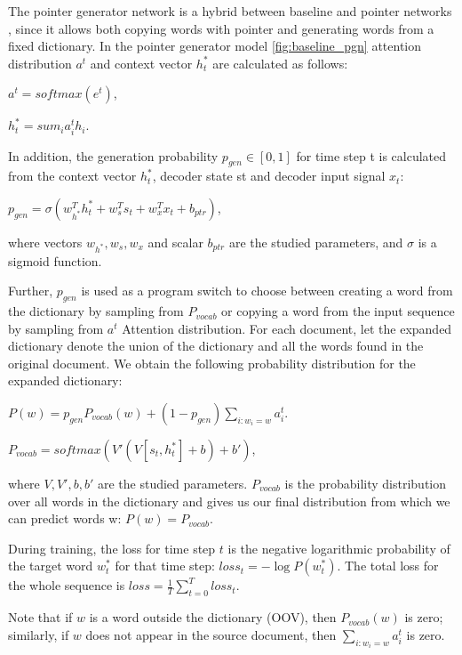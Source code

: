 \documentclass{article}
\begin{document}
The pointer generator network is a hybrid between baseline and pointer networks \cite{article_5}, since it allows both copying words with pointer and generating words from a fixed dictionary. In the pointer generator model \ref{fig:baseline_pgn} attention distribution $a^t$ and context vector $h^{*}_{t}$ are calculated as follows:
\begin{center}
    $a^t = softmax(e^t)$,
\end{center}
\begin{center}
    $h^{*}_{t} = sum_{i}a^{t}_{i}h_i$.
\end{center}

In addition, the generation probability $p_{gen}\in[0,1]$ for time step t is calculated from the context vector $h^{*}_{t}$, decoder state st and decoder input signal $x_t$:

\begin{center}
    $p_{gen} = \sigma(w^{T}_{h^{*}}h^{*}_{t} + w^{T}_{s}s_{t} + w^{T}_{x}x_{t} + b_{ptr})$,
\end{center}
where vectors $w_{h^{*}}, w_s, w_x$ and scalar $b_{ptr}$ are the studied parameters, and $\sigma$ is a sigmoid function.

Further, $p_{gen}$ is used as a program switch to choose between creating a word from the dictionary by sampling from $P_{vocab}$ or copying a word from the input sequence by sampling from $a^t$ Attention distribution. For each document, let the expanded dictionary denote the union of the dictionary and all the words found in the original document. We obtain the following probability distribution for the expanded dictionary:
\begin{center}
    $P(w) = p_{gen}P_{vocab}(w) + (1-p_{gen})\sum_{i: w_i = w}a^{t}_{i}$.
\end{center}
\begin{center}
    $P_{vocab} = softmax(V'(V[s_t,h^{*}_{t}]+b)+b')$,
\end{center}
where $V, V', b, b'$ are the studied parameters. $P_{vocab}$ is the probability distribution over all words in the dictionary and gives us our final distribution from which we can predict words w: $P(w) = P_{vocab}$.

During training, the loss for time step $t$ is the negative logarithmic probability of the target word $w^{*}_{t}$ for that time step: ${loss}_t = -\log{P(w^{*}_{t})}$. The total loss for the whole sequence is $loss = \frac{1}{T}\sum^{T}_{t = 0}{loss}_t$.

Note that if $w$ is a word outside the dictionary (OOV), then $P_{vocab}(w)$ is zero; similarly, if $w$ does not appear in the source document, then $\sum_{i: w_i = w}a^{t}_{i}$ is zero.
\end{document}
